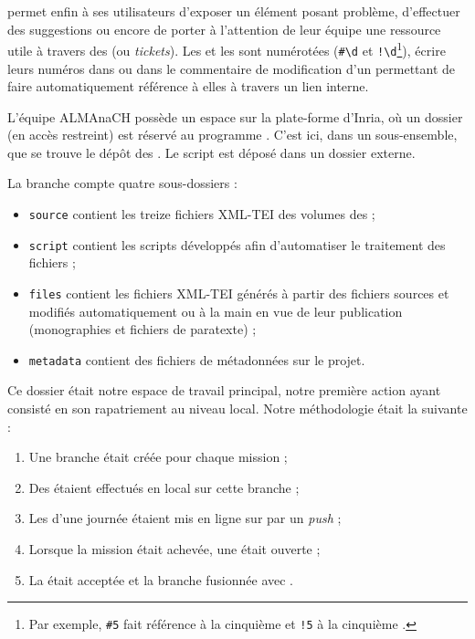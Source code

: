 \gitlab{} permet enfin à ses utilisateurs d'exposer un élément posant problème, d'effectuer des suggestions ou encore de porter à l'attention de leur équipe une ressource utile à travers des \issues{} (ou \textit{tickets}). Les \issues{} et les \mergerequests{} sont numérotées (\texttt{\#\textbackslash d} et \texttt{!\textbackslash d}\footnote{Par exemple, \texttt{\#5} fait référence à la cinquième \issue{} et \texttt{!5} à la cinquième \mergerequest{}.}), écrire leurs numéros dans \gitlab{} ou dans le commentaire de modification d'un \commit{} permettant de faire automatiquement référence à elles à travers un lien interne.

L'équipe ALMAnaCH possède un espace sur la plate-forme \gitlab{} d'Inria, où un dossier (en accès restreint) est réservé au programme \timeus{}. C'est ici, dans un sous-ensemble, que se trouve le dépôt des \odm. Le script \lse{} est déposé dans un dossier externe.

La branche \master{} compte quatre sous-dossiers :

\begin{itemize}
    \item \texttt{source} contient les treize fichiers XML-TEI des volumes des \odm{} ;
    \item \texttt{script} contient les scripts développés afin d'automatiser le traitement des fichiers ;
    \item \texttt{files} contient les fichiers XML-TEI générés à partir des fichiers sources et modifiés automatiquement ou à la main en vue de leur publication (monographies et fichiers de paratexte) ;
    \item \texttt{metadata} contient des fichiers de métadonnées sur le projet.
\end{itemize}

Ce dossier était notre espace de travail principal, notre première action ayant consisté en son rapatriement au niveau local. Notre méthodologie était la suivante :

\begin{enumerate}
    \item Une branche était créée pour chaque mission ;
    \item Des \commits{} étaient effectués en local sur cette branche ;
    \item Les \commits{} d'une journée étaient mis en ligne sur \gitlab{} par un \textit{push} ;
    \item Lorsque la mission était achevée, une \mergerequest{} était ouverte ;
    \item La \mergerequest{} était acceptée et la branche fusionnée avec \master.
\end{enumerate}

